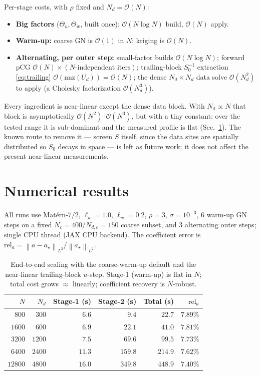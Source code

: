 \documentclass[11pt]{article}
\newcommand{\inv}{^{-1}}
\newcommand{\norm}[1]{\left\|#1\right\|}
\newcommand{\Th}{\Theta}
\newcommand{\bigO}{\mathcal{O}}
\begin{document}
Per-stage costs, with $\rho$ fixed and $N_d=\bigO(N)$:
\begin{itemize}[leftmargin=2em]
\item \textbf{Big factors} ($\Th_u,\Th_w$, built once): $\bigO(N\log N)$ build,
  $\bigO(N)$ apply.
\item \textbf{Warm-up:} coarse GN is $\bigO(1)$ in $N$; kriging is $\bigO(N)$.
\item \textbf{Alternating, per outer step:} small-factor builds $\bigO(N\log
  N)$; forward pCG $\bigO(N)\times(N\text{-independent iters})$; trailing-block
  $S_0\inv$ extraction \eqref{eq:trailing} $\bigO(\mathrm{nnz}(U_d))=\bigO(N)$;
  the dense $N_d\times N_d$ data solve $\bigO(N_d^2)$ to apply (a Cholesky
  factorization $\bigO(N_d^3)$).
\end{itemize}
Every ingredient is near-linear except the dense data block. With
$N_d\propto N$ that block is asymptotically $\bigO(N^2)$--$\bigO(N^3)$, but with
a tiny constant: over the tested range it is sub-dominant and the measured
profile is flat (Sec.~\ref{sec:results}). The known route to remove it ---
screen $S$ itself, since the data sites are spatially distributed so $S_0$
decays in space --- is left as future work; it does not affect the present
near-linear measurements.

\section{Numerical results}\label{sec:results}

All runs use Mat\'ern-$7/2$, $\ell_u=1.0$, $\ell_w=0.2$, $\rho=3$,
$\sigma=10^{-3}$, $6$ warm-up GN steps on a fixed $N_c=400$/$N_{d,c}=150$ coarse
subset, and $3$ alternating outer steps; single CPU thread (JAX CPU backend).
The coefficient error is $\mathrm{rel}_a=\norm{a-a_\star}_{L^2}/\norm{a_\star}_{L^2}$.

\begin{table}[h]
\centering
\caption{End-to-end scaling with the coarse-warm-up default and the near-linear
trailing-block $u$-step. Stage-1 (warm-up) is flat in $N$; total cost grows
$\approx$ linearly; coefficient recovery is $N$-robust.}
\label{tab:scaling}
\begin{tabular}{rrrrrr}
\toprule
$N$ & $N_d$ & Stage-1 (s) & Stage-2 (s) & Total (s) & $\mathrm{rel}_a$ \\
\midrule
$800$   & $300$  & $6.6$  & $9.4$   & $22.7$  & $7.89\%$ \\
$1600$  & $600$  & $6.9$  & $22.1$  & $41.0$  & $7.81\%$ \\
$3200$  & $1200$ & $7.5$  & $69.6$  & $99.5$  & $7.73\%$ \\
$6400$  & $2400$ & $11.3$ & $159.8$ & $214.9$ & $7.62\%$ \\
$12800$ & $4800$ & $16.0$ & $349.8$ & $448.9$ & $7.40\%$ \\
\bottomrule
\end{tabular}
\end{table}
\end{document}
